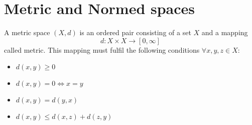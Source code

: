\documentclass[../../script.tex] {subfiles}
\begin{document}
\section{Metric and Normed spaces}

\begin{defi}
    A metric space $(X, d)$ is an ordered pair consisting of a set $X$ and a mapping 
    \[
        d: X \times X \longrightarrow [0, \infty]
    \] 
    called metric. This mapping must fulfil the following conditions $\forall x, y, z \in X$:
    \begin{itemize}
        \item $d(x, y) \ge 0$ 
        \item $d(x, y) = 0 \iff x = y$ 
        \item $d(x, y) = d(y, x)$ 
        \item $d(x, y) \le d(x, z) + d(z, y)$ 
    \end{itemize}
\end{defi}
\end{document}
